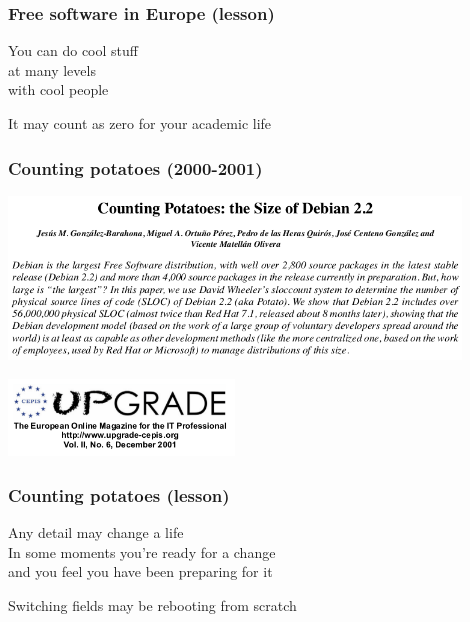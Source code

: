 \documentclass[17pt,aspectratio=169,hyperref=pdfusetitle]{beamer}
\begin{document}
\begin{frame}[fragile]
  \frametitle{Free software in Europe (lesson)}

  You can do cool stuff \\
  at many levels \\
  with cool people \\

  \begin{center}
    It may count as zero for your academic life
  \end{center}  
  
\end{frame}


\begin{frame}[fragile]
  \frametitle{Counting potatoes (2000-2001)}

  \begin{center}
  \includegraphics[width=12cm]{figs/counting-potatos}

  \includegraphics[width=6cm]{figs/upgrade}
  \end{center}  
  
\end{frame}

\begin{frame}[fragile]
  \frametitle{Counting potatoes (lesson)}

  Any detail may change a life \\
  In some moments you're ready for a change \\
  and you feel you have been preparing for it \\
  
  \begin{center}
    Switching fields may be rebooting from scratch
  \end{center}
  
\end{frame}
\end{document}
